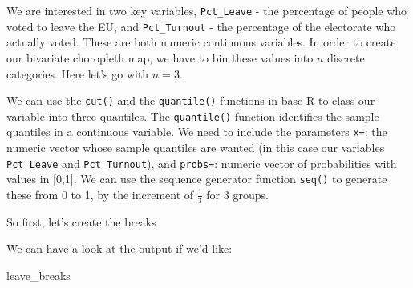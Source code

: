 \documentclass[
]{book}
\newenvironment{Shaded}{\begin{snugshade}}{\end{snugshade}}
\newcommand{\AttributeTok}[1]{\textcolor[rgb]{0.77,0.63,0.00}{#1}}
\newcommand{\ConstantTok}[1]{\textcolor[rgb]{0.00,0.00,0.00}{#1}}
\newcommand{\DecValTok}[1]{\textcolor[rgb]{0.00,0.00,0.81}{#1}}
\newcommand{\FunctionTok}[1]{\textcolor[rgb]{0.00,0.00,0.00}{#1}}
\newcommand{\NormalTok}[1]{#1}
\newcommand{\OtherTok}[1]{\textcolor[rgb]{0.56,0.35,0.01}{#1}}
\newcommand{\SpecialCharTok}[1]{\textcolor[rgb]{0.00,0.00,0.00}{#1}}
\begin{document}
We are interested in two key variables, \texttt{Pct\_Leave} - the percentage of people who voted to leave the EU, and \texttt{Pct\_Turnout} - the percentage of the electorate who actually voted. These are both numeric continuous variables. In order to create our bivariate choropleth map, we have to bin these values into \(n\) discrete categories. Here let's go with \(n = 3\).

We can use the \texttt{cut()} and the \texttt{quantile()} functions in base R to class our variable into three quantiles. The \texttt{quantile()} function identifies the sample quantiles in a continuous variable. We need to include the parameters \texttt{x=}: the numeric vector whose sample quantiles are wanted (in this case our variables \texttt{Pct\_Leave} and \texttt{Pct\_Turnout}), and \texttt{probs=}: numeric vector of probabilities with values in {[}0,1{]}. We can use the sequence generator function \texttt{seq()} to generate these from 0 to 1, by the increment of \(\frac{1}{3}\) for 3 groups.

So first, let's create the breaks

\begin{Shaded}
\end{Shaded}

We can have a look at the output if we'd like:

\begin{Shaded}
\begin{Highlighting}[]
\NormalTok{leave\_breaks}
\end{Highlighting}
\end{Shaded}
\end{document}
